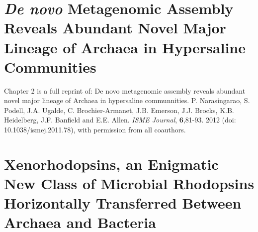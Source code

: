 \documentclass[12pt,chapterheads]{ucsd}
\begin{document}
%







%   
%   
%



\chapter{\textit{De novo} Metagenomic Assembly Reveals Abundant Novel Major Lineage of Archaea in Hypersaline Communities}

%
Chapter 2 is a full reprint of: De novo metagenomic assembly reveals abundant novel major lineage of Archaea in hypersaline communnities. P. Narasingarao, S. Podell, J.A. Ugalde, C. Brochier-Armanet, J.B. Emerson, J.J. Brocks, K.B. Heidelberg, J.F. Banfield and E.E. Allen. \textit{ISME Journal}, \textbf{6},81-93. 2012 (doi: 10.1038/ismej.2011.78), with permission from all coauthors.


\chapter{Xenorhodopsins, an Enigmatic New Class of Microbial Rhodopsins Horizontally Transferred Between Archaea and Bacteria}

%
\end{document}
